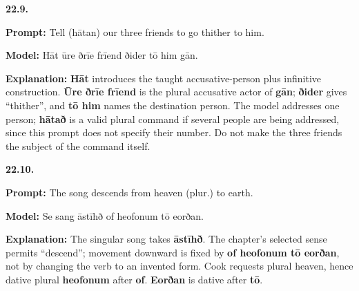 \par\begin{minipage}{\linewidth}\raggedright
\textbf{22.9.}

\textbf{Prompt:} Tell (hātan) our three friends to go thither to him.

\textbf{Model:} Hāt ūre ðrīe frīend ðider tō him gān.

\textbf{Explanation:} \textbf{Hāt} introduces the taught accusative-person plus infinitive construction. \textbf{Ūre ðrīe frīend} is the plural accusative actor of \textbf{gān}; \textbf{ðider} gives “thither”, and \textbf{tō him} names the destination person. The model addresses one person; \textbf{hātað} is a valid plural command if several people are being addressed, since this prompt does not specify their number. Do not make the three friends the subject of the command itself.

\end{minipage}\par\addvspace{4pt}

\par\begin{minipage}{\linewidth}\raggedright
\textbf{22.10.}

\textbf{Prompt:} The song descends from heaven (plur.) to earth.

\textbf{Model:} Se sang āstīhð of heofonum tō eorðan.

\textbf{Explanation:} The singular song takes \textbf{āstīhð}. The chapter’s selected sense permits “descend”; movement downward is fixed by \textbf{of heofonum tō eorðan}, not by changing the verb to an invented form. Cook requests plural heaven, hence dative plural \textbf{heofonum} after \textbf{of}. \textbf{Eorðan} is dative after \textbf{tō}.

\end{minipage}\par\addvspace{4pt}

